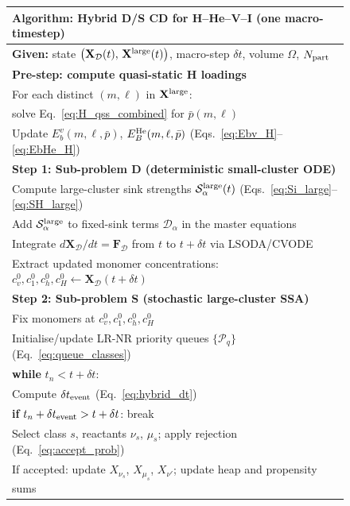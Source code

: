 \documentclass[pdflatex,sn-basic]{sn-jnl} %
\begin{document}
\begin{figure}[htbp]
\centering
\renewcommand{\arraystretch}{1.15}
\begin{tabular}{l}
\hline\hline
\textbf{Algorithm: Hybrid D/S CD for H--He--V--I (one macro-timestep)} \\
\hline
\textbf{Given:} state $\bigl(\mathbf{X}_{\mathcal{D}}(t),\,
  \mathbf{X}^{\rm large}(t)\bigr)$, macro-step $\delta t$,
  volume $\Omega$, $N_{\rm part}$ \\[3pt]
%
\textbf{Pre-step: compute quasi-static H loadings} \\
\quad For each distinct $(m,\ell)$ in $\mathbf{X}^{\rm large}$: \\
\qquad solve Eq.~\eqref{eq:H_qss_combined} for $\bar{p}(m,\ell)$ \\
\quad Update $E_b^v(m,\ell,\bar{p})$, $E_B^{\rm He}(m,\ell,\bar{p})$
  (Eqs.~\ref{eq:Ebv_H}--\ref{eq:EbHe_H}) \\[3pt]
%
\textbf{Step 1: Sub-problem D (deterministic small-cluster ODE)} \\
\quad Compute large-cluster sink strengths
  $\mathcal{S}_\alpha^{\rm large}(t)$
  (Eqs.~\ref{eq:Si_large}--\ref{eq:SH_large}) \\
\quad Add $\mathcal{S}_\alpha^{\rm large}$ to fixed-sink terms
  $\mathcal{D}_\alpha$ in the master equations \\
\quad Integrate
  $d\mathbf{X}_{\mathcal{D}}/dt = \mathbf{F}_{\mathcal{D}}$
  from $t$ to $t+\delta t$ via LSODA/CVODE \\
\quad Extract updated monomer concentrations:
  $c_v^0, c_1^0, c_h^0, c_H^0 \leftarrow
  \mathbf{X}_{\mathcal{D}}(t+\delta t)$ \\[3pt]
%
\textbf{Step 2: Sub-problem S (stochastic large-cluster SSA)} \\
\quad Fix monomers at $c_v^0, c_1^0, c_h^0, c_H^0$ \\
\quad Initialise/update LR-NR priority queues
  $\{\mathcal{P}_q\}$ (Eq.~\ref{eq:queue_classes}) \\
\quad \textbf{while} $t_n < t + \delta t$: \\
\qquad Compute $\delta t_{\rm event}$
  (Eq.~\ref{eq:hybrid_dt}) \\
\qquad \textbf{if} $t_n + \delta t_{\rm event} > t + \delta t$:
  break \\
\qquad Select class $s$, reactants $\nu_s$, $\mu_s$;
  apply rejection (Eq.~\ref{eq:accept_prob}) \\
\qquad If accepted: update $X_{\nu_s}$, $X_{\mu_s}$, $X_{\nu'}$;
  update heap and propensity sums \\

\end{tabular}
\end{figure}
\end{document}
